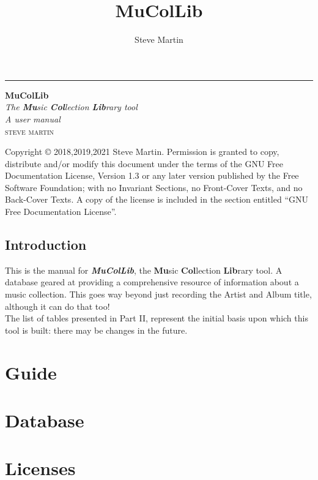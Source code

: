 \documentclass[12pt,a4paper,final,twoside,titlepage]{book}
\author{\LARGE Steve Martin}
\title{\Huge MuColLib}
\begin{document}

\begin{titlepage} %
	
	\raggedleft %
	
	\rule{1pt}{\textheight} %
	\hspace{0.05\textwidth} %
	\parbox[b]{0.75\textwidth}{ %
		
		{\Huge\bfseries MuColLib}\\[2\baselineskip] %
		{\large\textit{The \textbf{Mu}sic \textbf{Col}lection \textbf{Lib}rary tool}}\\
		{\large\textit{A user manual}}\\[4\baselineskip] %
		{\Large\textsc{steve martin}} %
		\vspace{0.5\textheight} %
	}

\end{titlepage}
\null
\vfill
Copyright \copyright{}  2018,2019,2021  Steve Martin.
Permission is granted to copy, distribute and/or modify this document
under the terms of the GNU Free Documentation License, Version 1.3
or any later version published by the Free Software Foundation;
with no Invariant Sections, no Front-Cover Texts, and no Back-Cover Texts.
A copy of the license is included in the section entitled ``GNU
Free Documentation License''.
\frontmatter
\tableofcontents
\newpage
\chapter{Introduction}
This is the manual for \textbf{\textit{MuColLib}}, the \textbf{Mu}sic \textbf{Col}lection \textbf{Lib}rary tool. A database geared at providing a comprehensive resource of information about a music collection.  This goes way beyond just recording the Artist and Album title, although it can do that too!
\\

The list of tables presented in Part II, represent the initial basis upon which this tool is built: there may be changes in the future.
 
\mainmatter
\part{Guide}



\part{Database}

\part{Licenses}

\newpage

\end{document}
